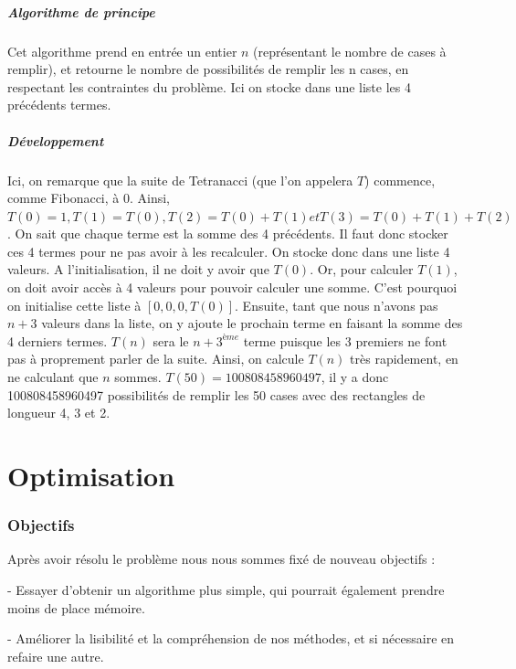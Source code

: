 \documentclass{article}
\begin{document}
\subsubsection{Algorithme de principe}

Cet algorithme prend en entrée un entier $n$ (représentant le nombre de cases à remplir), et retourne le nombre de possibilités de remplir les n cases, en respectant les contraintes du problème. Ici on stocke dans une liste les 4 précédents termes.
\bigbreak


\subsubsection{Développement}
Ici, on remarque que la suite de Tetranacci (que l'on appelera $T$) commence, comme Fibonacci, à 0. Ainsi, $T(0) = 1, T(1) = T(0), T(2) = T(0) + T(1) et T(3) = T(0) + T(1) + T(2)$. On sait que chaque terme est la somme des 4 précédents. Il faut donc stocker ces 4 termes pour ne pas avoir à les recalculer. On stocke donc dans une liste 4 valeurs. A l'initialisation, il ne doit y avoir que $T(0)$. Or, pour calculer $T(1)$, on doit avoir accès à 4 valeurs pour pouvoir calculer une somme. C'est pourquoi on initialise cette liste à $[0,0,0,T(0)]$. Ensuite, tant que nous n'avons pas $n+3$ valeurs dans la liste, on y ajoute le prochain terme en faisant la somme des 4 derniers termes. $T(n)$ sera le $n+3^{ème}$ terme puisque les 3 premiers ne font pas à proprement parler de la suite. Ainsi, on calcule $T(n)$ très rapidement, en ne calculant que $n$ sommes. $T(50) = 100808458960497$, il y a donc 100808458960497 possibilités de remplir les 50 cases avec des rectangles de longueur 4, 3 et 2.

\newpage
\part {Optimisation}
\section {Objectifs}

Après avoir résolu le problème nous nous sommes fixé de nouveau objectifs :

\noindent - Essayer d'obtenir un algorithme plus simple, qui pourrait également prendre moins de place mémoire.

\noindent - Améliorer la lisibilité et la compréhension de nos méthodes, et si nécessaire en refaire une autre.
\end{document}

